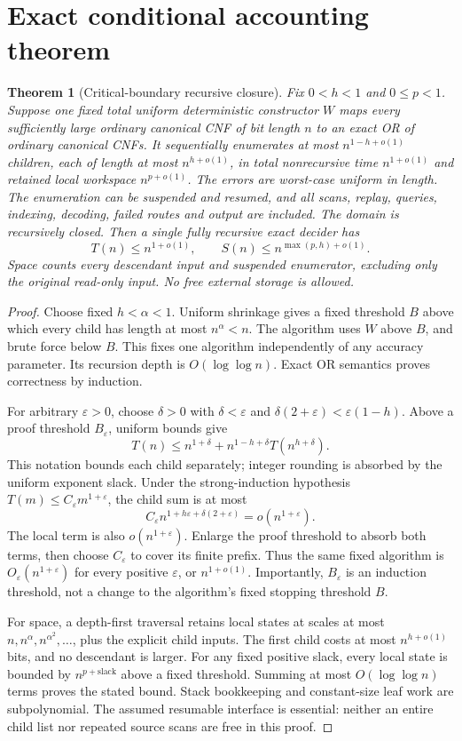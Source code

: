 \documentclass[11pt]{article}
\newtheorem{theorem}{Theorem}
\begin{document}
\section{Exact conditional accounting theorem}
\begin{theorem}[Critical-boundary recursive closure]
Fix $0<h<1$ and $0\le p<1$. Suppose one fixed total uniform deterministic
constructor $W$ maps every sufficiently large ordinary canonical CNF of
bit length $n$ to an exact OR of ordinary canonical CNFs. It sequentially
enumerates at most $n^{1-h+o(1)}$ children, each of length at most
$n^{h+o(1)}$, in total nonrecursive time $n^{1+o(1)}$ and retained local
workspace $n^{p+o(1)}$. The errors are worst-case uniform in length.
The enumeration can be suspended and resumed, and all scans, replay,
queries, indexing, decoding, failed routes and output are included.
The domain is recursively closed. Then a single fully recursive exact
decider has
\[
 T(n)\le n^{1+o(1)},\qquad
 S(n)\le n^{\max(p,h)+o(1)}.
\]
Space counts every descendant input and suspended enumerator, excluding
only the original read-only input. No free external storage is allowed.
\end{theorem}
\begin{proof}
Choose fixed $h<\alpha<1$. Uniform shrinkage gives a fixed threshold $B$
above which every child has length at most $n^\alpha<n$. The algorithm
uses $W$ above $B$, and brute force below $B$. This fixes one algorithm
independently of any accuracy parameter. Its recursion depth is
$O(\log\log n)$. Exact OR semantics proves correctness by induction.

For arbitrary $\varepsilon>0$, choose $\delta>0$ with
$\delta<\varepsilon$ and
$\delta(2+\varepsilon)<\varepsilon(1-h)$.
Above a proof threshold $B_\varepsilon$, uniform bounds give
\[
 T(n)\le n^{1+\delta}
       +n^{1-h+\delta}T(n^{h+\delta}).
\]
This notation bounds each child separately; integer rounding is absorbed
by the uniform exponent slack. Under the strong-induction hypothesis
$T(m)\le C_\varepsilon m^{1+\varepsilon}$, the child sum is at most
\[
C_\varepsilon n^{1+h\varepsilon+\delta(2+\varepsilon)}
=o(n^{1+\varepsilon}).
\]
The local term is also $o(n^{1+\varepsilon})$. Enlarge the proof threshold
to absorb both terms, then choose $C_\varepsilon$ to cover its finite
prefix. Thus the same fixed algorithm is $O_\varepsilon(n^{1+\varepsilon})$
for every positive $\varepsilon$, or $n^{1+o(1)}$.
Importantly, $B_\varepsilon$ is an induction threshold, not a change to
the algorithm's fixed stopping threshold $B$.

For space, a depth-first traversal retains local states at scales at most
$n,n^\alpha,n^{\alpha^2},\ldots$, plus the explicit child inputs.
The first child costs at most $n^{h+o(1)}$ bits, and no descendant is
larger. For any fixed positive slack, every local state is bounded by
$n^{p+\text{slack}}$ above a fixed threshold. Summing at most
$O(\log\log n)$ terms proves the stated bound. Stack bookkeeping and
constant-size leaf work are subpolynomial. The assumed resumable interface
is essential: neither an entire child list nor repeated source scans are
free in this proof.
\end{proof}
\end{document}
